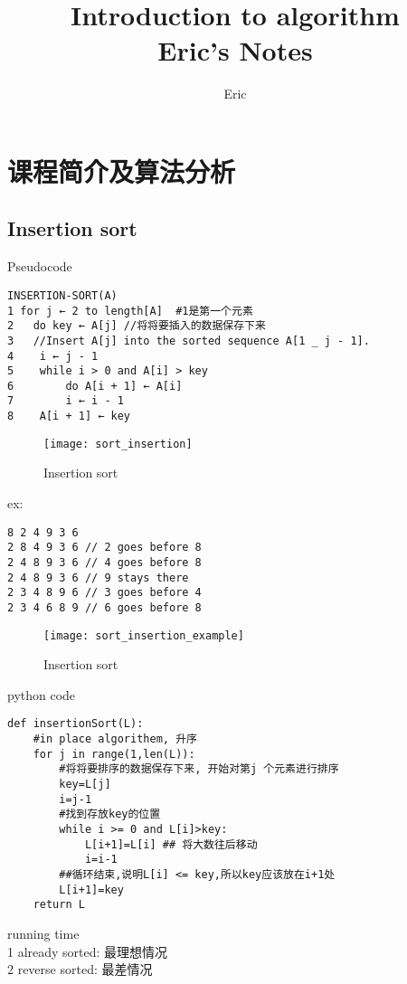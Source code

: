 \documentclass{article}
\begin{document}
\title{Introduction to algorithm \\Eric's Notes}
\author{Eric}
\maketitle
\newpage
\tableofcontents
\newpage

\section{课程简介及算法分析}
\subsection{Insertion sort}
Pseudocode
\begin{verbatim}
INSERTION-SORT(A)
1 for j ← 2 to length[A]  #1是第一个元素
2 	do key ← A[j] //将将要插入的数据保存下来
3 	//Insert A[j] into the sorted sequence A[1 _ j - 1].
4	 i ← j - 1
5	 while i > 0 and A[i] > key
6		 do A[i + 1] ← A[i]
7		 i ← i - 1
8	 A[i + 1] ← key
\end{verbatim}
\begin{figure}[htbp]
  \centering
  \texttt{[image: sort\_insertion]}\\
  \caption{Insertion sort}\label{fig.sort.insertion}
\end{figure}

ex:
\begin{verbatim}
8 2 4 9 3 6
2 8 4 9 3 6 // 2 goes before 8
2 4 8 9 3 6 // 4 goes before 8
2 4 8 9 3 6 // 9 stays there
2 3 4 8 9 6 // 3 goes before 4
2 3 4 6 8 9 // 6 goes before 8
\end{verbatim}

\begin{figure}[htbp]
  \centering
  \texttt{[image: sort\_insertion\_example]}\\
  \caption{Insertion sort}\label{fig.sort.insertion.example}
\end{figure}

python code
\begin{verbatim}
def insertionSort(L):
	#in place algorithem, 升序
	for j in range(1,len(L)):
		#将将要排序的数据保存下来, 开始对第j 个元素进行排序
		key=L[j]
		i=j-1
		#找到存放key的位置
		while i >= 0 and L[i]>key:
			L[i+1]=L[i] ## 将大数往后移动
			i=i-1
		##循环结束,说明L[i] <= key,所以key应该放在i+1处
		L[i+1]=key
	return L
\end{verbatim}

running time\\
1 already sorted: 最理想情况\\
2 reverse sorted: 最差情况
\end{document}
